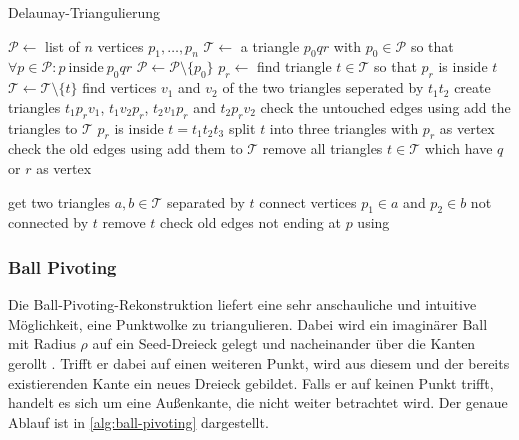 \begin{algorithm}[H]
\caption[Delaunay-Triangulierung]{Delaunay-Triangulierung \cite[200--201]{berg2000comp}}
\label{alg:delaunay-triangulierung}
\begin{algorithmic}
\State $\mathcal{P} \gets$ list of $n$ vertices $p_1, \dots, p_n$
\State $\mathcal{T} \gets$ a triangle $p_0 q r$ with $p_0 \in \mathcal{P}$ so that $\forall p \in \mathcal{P} : p \mathrm{\ inside\ } p_0 q r$
\State $\mathcal{P} \gets \mathcal{P} \setminus \{p_0\}$
	\State $p_r \gets$ 
	\State find triangle $t \in \mathcal{T}$ so that $p_r$ is inside $t$
	\State $\mathcal{T} \gets \mathcal{T} \setminus \{t\}$
		\State find vertices $v_1$ and $v_2$ of the two triangles seperated by $t_1t_2$
		\State create triangles $t_1p_rv_1$, $t_1v_2p_r$, $t_2v_1p_r$ and $t_2p_rv_2$
		\State check the untouched edges using 
		\State add the triangles to $\mathcal{T}$
	\Else
		\State $p_r$ is inside $t = t_1t_2t_3$
		\State split $t$ into three triangles with $p_r$ as vertex
		\State check the old edges using 
		\State add them to $\mathcal{T}$
	\EndIf
	\State remove all triangles $t \in \mathcal{T}$ which have $q$ or $r$ as vertex
\EndWhile
\State {}

		\State get two triangles $a, b \in \mathcal{T}$ separated by $t$
		\State connect vertices $p_1 \in a$ and $p_2 \in b$ not connected by $t$
		\State remove $t$
		\State check old edges not ending at $p$ using 
	\EndIf
\EndFunction
\end{algorithmic}
\end{algorithm}

\subsubsection{Ball Pivoting}
\label{subsubsection:ball-pivoting}

Die Ball-Pivoting-Rekonstruktion liefert eine sehr anschauliche und intuitive Möglichkeit, eine Punktwolke zu triangulieren.
Dabei wird ein imaginärer Ball mit Radius $\rho$ auf ein Seed-Dreieck gelegt und nacheinander über die Kanten gerollt \cite{bernardini1999ball}.
Trifft er dabei auf einen weiteren Punkt, wird aus diesem und der bereits existierenden Kante ein neues Dreieck gebildet.
Falls er auf keinen Punkt trifft, handelt es sich um eine Außenkante, die nicht weiter betrachtet wird.
Der genaue Ablauf ist in \autoref{alg:ball-pivoting} dargestellt.

